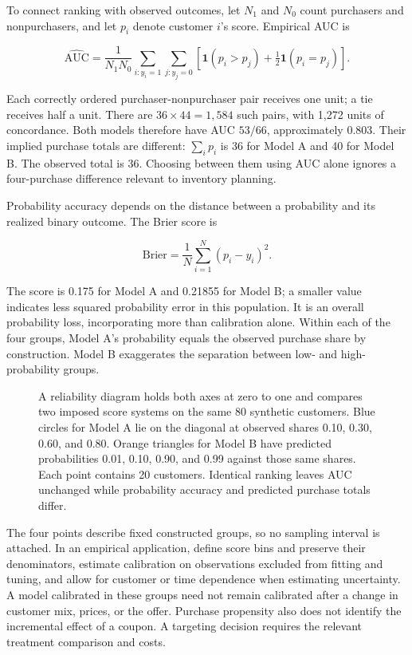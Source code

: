 To connect ranking with observed outcomes, let \(N_1\) and \(N_0\) count
purchasers and nonpurchasers, and let \(p_i\) denote customer \(i\)'s
score. Empirical AUC is

\[
\widehat{\mathrm{AUC}}=
\frac{1}{N_1N_0}\sum_{i:y_i=1}\sum_{j:y_j=0}
\left[\mathbf{1}(p_i>p_j)+\tfrac12\mathbf{1}(p_i=p_j)\right].
\]

Each correctly ordered purchaser-nonpurchaser pair receives one unit; a
tie receives half a unit. There are \(36\times44=1{,}584\) such pairs,
with 1,272 units of concordance. Both models therefore have AUC
\(53/66\), approximately 0.803. Their implied purchase totals are
different: \(\sum_i p_i\) is 36 for Model A and 40 for Model B. The
observed total is 36. Choosing between them using AUC alone ignores a
four-purchase difference relevant to inventory planning.

Probability accuracy depends on the distance between a probability and
its realized binary outcome. The Brier score is

\[
\mathrm{Brier}=\frac{1}{N}\sum_{i=1}^{N}(p_i-y_i)^2.
\]

The score is 0.175 for Model A and 0.21855 for Model B; a smaller value
indicates less squared probability error in this population. It is an
overall probability loss, incorporating more than calibration alone.
Within each of the four groups, Model A's probability equals the
observed purchase share by construction. Model B exaggerates the
separation between low- and high-probability groups.

\begin{figure}[htbp]
\centering

\caption{A reliability diagram holds both axes at zero to one and compares two imposed score systems on the same 80 synthetic customers. Blue circles for Model A lie on the diagonal at observed shares 0.10, 0.30, 0.60, and 0.80. Orange triangles for Model B have predicted probabilities 0.01, 0.10, 0.90, and 0.99 against those same shares. Each point contains 20 customers. Identical ranking leaves AUC unchanged while probability accuracy and predicted purchase totals differ.}\label{fig:M07_ranking_probabilities}
\end{figure}

The four points describe fixed constructed groups, so no sampling
interval is attached. In an empirical application, define score bins and
preserve their denominators, estimate calibration on observations
excluded from fitting and tuning, and allow for customer or time
dependence when estimating uncertainty. A model calibrated in these
groups need not remain calibrated after a change in customer mix,
prices, or the offer. Purchase propensity also does not identify the
incremental effect of a coupon. A targeting decision requires the
relevant treatment comparison and costs.

